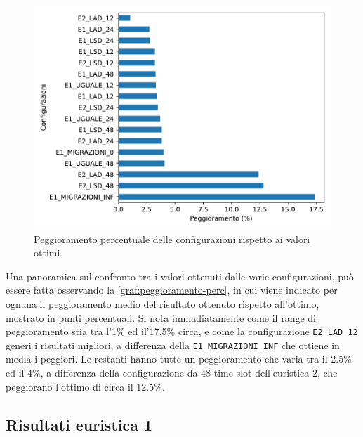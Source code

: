 \begin{figure}[t]
    \centering
    \includegraphics[scale=0.75]{img/grafico-peggioramento-percentuale.pdf}
    \caption{Peggioramento percentuale delle configurazioni rispetto ai valori ottimi.}
    \label{graf:peggioramento-perc}
\end{figure}

Una panoramica sul confronto tra i valori ottenuti dalle varie configurazioni, può essere fatta osservando la \autoref{graf:peggioramento-perc}, in cui viene indicato per ognuna il peggioramento medio del risultato ottenuto rispetto all'ottimo, mostrato in punti percentuali. Si nota immadiatamente come il range di peggioramento stia tra l'1\% ed il'17.5\% circa, e come la configurazione \texttt{E2\_LAD\_12} generi i risultati migliori, a differenza della \texttt{E1\_MIGRAZIONI\_INF} che ottiene in media i peggiori. Le restanti hanno tutte un peggioramento che varia tra il 2.5\% ed il 4\%, a differenza della configurazione da 48 time-slot dell'euristica 2, che peggiorano l'ottimo di circa il 12.5\%.

\subsection{Risultati euristica 1}

